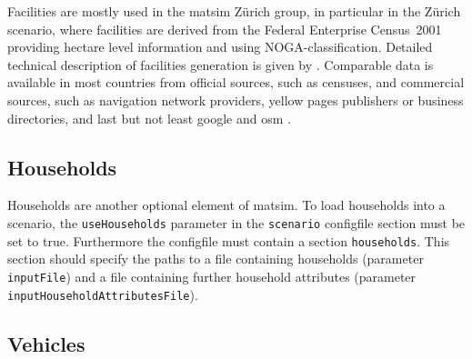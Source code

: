Facilities are mostly used in the \gls{matsim} Zürich group, in particular in the Zürich scenario, where facilities are derived from the Federal Enterprise Census~2001 \citep[][]{SwissEnterpriseCensus_manual_2001} providing hectare level information and using NOGA-classification. Detailed technical description of facilities generation is given by \citet[][]{Meister_TechRep_IVT_2008, Meister_unpub_IVT_2007}. Comparable data is available in most countries from official sources, such as censuses, and commercial sources, such as navigation network providers, yellow pages publishers or business directories, and last but not least google and \gls{osm} \citep[][]{OpenStreetMap_Webpage_2015}.



\subsection{Households}
\label{sec:extending-households}
Households are another optional element of \gls{matsim}. To load households into a scenario, the \lstinline|useHouseholds| parameter in the \lstinline|scenario| \gls{configfile} section must be set to true. Furthermore the \gls{configfile} must contain a section \lstinline|households|. This section should specify the paths to a file containing households (parameter \lstinline|inputFile|) and a file containing further household attributes (parameter \lstinline|inputHouseholdAttributesFile|).



\subsection{Vehicles}
\label{sec:extending-vehicles}

